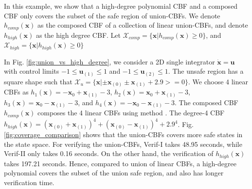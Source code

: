 \documentclass[letterpaper, 10 pt, conference]{ieeeconf}  %
\begin{document}
In this example, we show that a high-degree polynomial CBF and a composed CBF only covers the subset of the safe region of union-CBFs. We denote $h_{comp}(\mathbf{x})$ as the composed CBF of a collection of linear union-CBFs, and denote $h_{high}(\mathbf{x})$ as the high degree CBF. Let $\mathcal{X}_{comp} = \{\mathbf{x}|h_{comp}(\mathbf{x})\geq 0\}$, and $\mathcal{X}_{high} = \{\mathbf{x}|h_{high}(\mathbf{x})\geq 0\}$


In Fig. \ref{fig:union_vs_high_degree}, we consider a 2D single integrator $\dot{\mathbf{x}}=\mathbf{u}$ with control limits $-1 \leq \mathbf{u}_{(1)}\leq 1$ and $-1 \leq \mathbf{u}_{(2)}\leq 1$. The unsafe region has a square shape such that 
$\mathcal{X}_u = 
\{\mathbf{x}|
\pm \mathbf{x}_{(0)} \pm \mathbf{x}_{(1)} + 2.9 >=0 \}$. 
We choose 4 linear CBFs as 
$h_1(\mathbf{x})=-\mathbf{x}_{0} + \mathbf{x}_{(1)}-3$, 
$h_2(\mathbf{x})=\mathbf{x}_{0} + \mathbf{x}_{(1)}-3$, $h_3(\mathbf{x})=\mathbf{x}_{0} - \mathbf{x}_{(1)}-3$, and $h_4(\mathbf{x})=-\mathbf{x}_{0} - \mathbf{x}_{(1)}-3$. The composed CBF $h_{comp}(\mathbf{x})$ composes the 4 linear CBFs using method \cite{molnar2023composing}. The degree-4 CBF $h_{high}(\mathbf{x}) = (\mathbf{x}_{(0)} + \mathbf{x}_{(1)})^4 + (\mathbf{x}_{(0)} - \mathbf{x}_{(1)})^4 + 2.9^4$. Fig.\ref{fig:coverage_comparison} shows that the union-CBFs covers more safe states in the state space. For verifying the union-CBFs, Verif-I takes 48.95 seconds, while Verif-II only takes 0.16 seconds. On the other hand, the verification of $h_{high}(\mathbf{x})$ takes 197.21 seconds. Hence, compared to union of linear CBFs, a high-degree polynomial covers the subset of the union safe region, and also has longer verification time.
\end{document}
